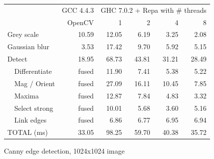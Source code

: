 \begin{figure}
\vspace{-0.8em}
\hspace{-0.5em}
\begin{tabular}{l|r|rrrr}
		& GCC 4.4.3	& \multicolumn{4}{c}{GHC 7.0.2 + Repa with \# threads} \\
		& OpenCV	&  1     &      2 &      4 &      8	\\
\hline
Grey scale	&  10.59	&  12.05 &   6.19 &   3.25 &   2.08	\\
Gaussian blur	&   3.53	&  17.42 &   9.70 &   5.92 &   5.15	\\
Detect		&  18.95	&  68.73 &  43.81 &  31.21 &  28.49	\\
\hline
~~Differentiate &  fused	&  11.90 &   7.41 &   5.38 &   5.22	\\
~~Mag / Orient 	&  fused	&  27.09 &  16.11 &  10.45 &   7.85	\\
~~Maxima 	&  fused	&  12.87 &   7.84 &   4.83 &   3.32	\\
~~Select strong	&  fused	&  10.01 &   5.68 &   3.60 &   5.16	\\
~~Link edges	&  fused	&  6.86 &   6.77 &   6.95 &   6.94	\\[0.5ex]
\hline
TOTAL (ms)	& 33.05		&  98.25 &  59.70 &  40.38 &  35.72
\end{tabular}

\caption{Canny edge detection, 1024x1024 image}
\label{fig:CannyBreakdown}
\end{figure}


